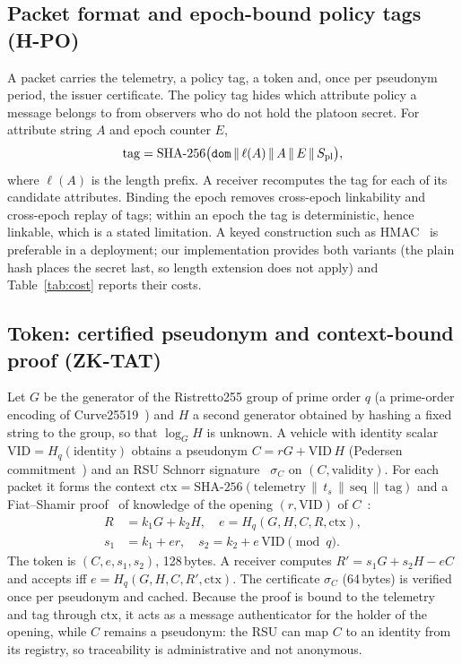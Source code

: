 \documentclass[journal]{IEEEtran}
\begin{document}
\subsection{Packet format and epoch-bound policy tags (H-PO)}
A packet carries the telemetry, a policy tag, a token and, once per pseudonym period, the issuer certificate. The policy tag hides which attribute policy a message belongs to from observers who do not hold the platoon secret. For attribute string $A$ and epoch counter $E$,
\begin{equation}
\mathrm{tag}=\mathrm{SHA\text{-}256}\big(\texttt{dom}\,\|\,\ell(A)\,\|\,A\,\|\,E\,\|\,S_{\rm pl}\big),
\end{equation}
where $\ell(A)$ is the length prefix. A receiver recomputes the tag for each of its candidate attributes. Binding the epoch removes cross-epoch linkability and cross-epoch replay of tags; within an epoch the tag is deterministic, hence linkable, which is a stated limitation. A keyed construction such as HMAC~\cite{hmac} is preferable in a deployment; our implementation provides both variants (the plain hash places the secret last, so length extension does not apply) and Table~\ref{tab:cost} reports their costs.

\subsection{Token: certified pseudonym and context-bound proof (ZK-TAT)}
Let $G$ be the generator of the Ristretto255 group of prime order $q$ (a prime-order encoding of Curve25519~\cite{bernstein2012,rfc8032}) and $H$ a second generator obtained by hashing a fixed string to the group, so that $\log_G H$ is unknown. A vehicle with identity scalar $\mathrm{VID}=H_q(\text{identity})$ obtains a pseudonym $C=rG+\mathrm{VID}\,H$ (Pedersen commitment~\cite{pedersen1991}) and an RSU Schnorr signature~\cite{schnorr1991} $\sigma_C$ on $(C,\text{validity})$. For each packet it forms the context $\mathrm{ctx}=\mathrm{SHA\text{-}256}(\text{telemetry}\,\|\,t_s\,\|\,\mathrm{seq}\,\|\,\mathrm{tag})$ and a Fiat--Shamir proof~\cite{fiatshamir1986} of knowledge of the opening $(r,\mathrm{VID})$ of $C$~\cite{okamoto1992}:
\begin{align}
R&=k_1G+k_2H,\quad e=H_q(G,H,C,R,\mathrm{ctx}),\\
s_1&=k_1+er,\quad s_2=k_2+e\,\mathrm{VID}\pmod q.
\end{align}
The token is $(C,e,s_1,s_2)$, 128\,bytes. A receiver computes $R'=s_1G+s_2H-eC$ and accepts iff $e=H_q(G,H,C,R',\mathrm{ctx})$. The certificate $\sigma_C$ (64\,bytes) is verified once per pseudonym and cached. Because the proof is bound to the telemetry and tag through $\mathrm{ctx}$, it acts as a message authenticator for the holder of the opening, while $C$ remains a pseudonym: the RSU can map $C$ to an identity from its registry, so traceability is administrative and not anonymous.
\end{document}
